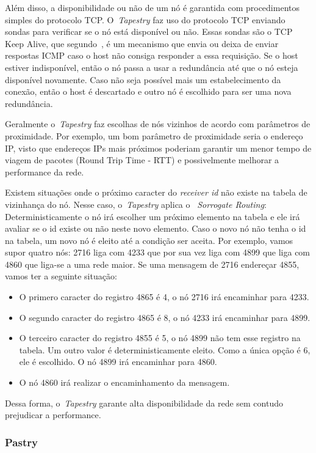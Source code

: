Além disso, a disponibilidade ou não de um nó é garantida com procedimentos simples do protocolo TCP. O~\emph{Tapestry} faz uso do protocolo TCP enviando sondas para verificar se o nó está disponível ou não. Essas sondas são o TCP Keep Alive, que segundo~\cite{stevens93}, é um mecanismo que envia ou deixa de enviar respostas ICMP caso o host não consiga responder a essa requisição. Se o host estiver indisponível, então o nó passa a usar a redundância até que o nó esteja disponível novamente. Caso não seja possível mais um estabelecimento da conexão, então o host é descartado e outro nó é escolhido para ser uma nova redundância.

Geralmente o~\emph{Tapestry} faz escolhas de nós vizinhos de acordo com parâmetros de proximidade. Por exemplo, um bom parâmetro de proximidade seria o endereço IP, visto que endereços IPs mais próximos poderiam garantir um menor tempo de viagem de pacotes (Round Trip Time - RTT) e possivelmente melhorar a performance da rede.

Existem situações onde o próximo caracter do \emph{receiver id} não existe na tabela de vizinhança do nó. Nesse caso, o~\emph{Tapestry} aplica o ~\emph{Sorrogate Routing}: Deterministicamente o nó irá escolher um próximo elemento na tabela e ele irá avaliar se o id existe ou não neste novo elemento. Caso o novo nó não tenha o id na tabela, um novo nó é eleito até a condição ser aceita. Por exemplo, vamos supor quatro nós: 2716 liga com 4233 que por sua vez liga com 4899 que liga com 4860 que liga-se a uma rede maior. Se uma mensagem de 2716 endereçar 4855, vamos ter a seguinte situação:
\begin{itemize}
	\item O primero caracter do registro 4865 é 4, o nó 2716 irá encaminhar para 4233.
	\item O segundo caracter do registro 4865 é 8, o nó 4233 irá encaminhar para 4899.
	\item O terceiro caracter do registro 4855 é 5, o nó 4899 não tem esse registro na tabela. Um outro valor é deterministicamente eleito. Como a única opção é 6, ele é escolhido. O nó 4899 irá encaminhar para 4860.
	\item O nó 4860 irá realizar o encaminhamento da mensagem.
\end{itemize}

Dessa forma, o~\emph{Tapestry} garante alta disponibilidade da rede sem contudo prejudicar a performance.

\subsubsection{Pastry}

